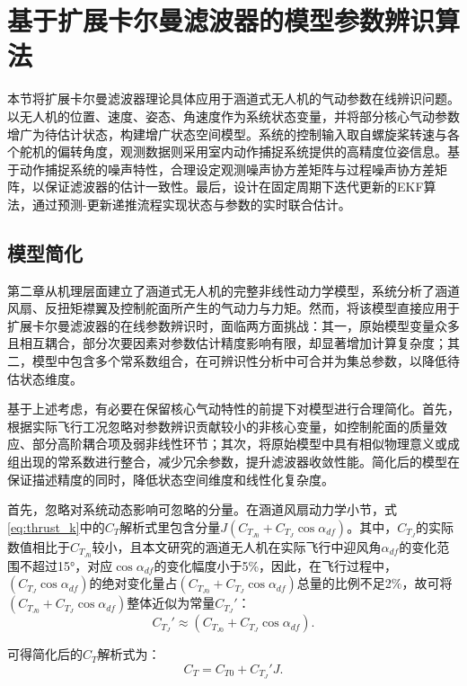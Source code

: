 \section{基于扩展卡尔曼滤波器的模型参数辨识算法} %
本节将扩展卡尔曼滤波器理论具体应用于涵道式无人机的气动参数在线辨识问题。以无人机的位置、速度、姿态、角速度作为系统状态变量，并将部分核心气动参数增广为待估计状态，构建增广状态空间模型。系统的控制输入取自螺旋桨转速与各个舵机的偏转角度，观测数据则采用室内动作捕捉系统提供的高精度位姿信息。基于动作捕捉系统的噪声特性，合理设定观测噪声协方差矩阵与过程噪声协方差矩阵，以保证滤波器的估计一致性。最后，设计在固定周期下迭代更新的EKF算法，通过预测-更新递推流程实现状态与参数的实时联合估计。
\subsection{模型简化} %
\label{sec:model_simplification}
第二章从机理层面建立了涵道式无人机的完整非线性动力学模型，系统分析了涵道风扇、反扭矩襟翼及控制舵面所产生的气动力与力矩。然而，将该模型直接应用于扩展卡尔曼滤波器的在线参数辨识时，面临两方面挑战：其一，原始模型变量众多且相互耦合，部分次要因素对参数估计精度影响有限，却显著增加计算复杂度；其二，模型中包含多个常系数组合，在可辨识性分析中可合并为集总参数，以降低待估状态维度。

基于上述考虑，有必要在保留核心气动特性的前提下对模型进行合理简化。首先，根据实际飞行工况忽略对参数辨识贡献较小的非核心变量，如控制舵面的质量效应、部分高阶耦合项及弱非线性环节；其次，将原始模型中具有相似物理意义或成组出现的常系数进行整合，减少冗余参数，提升滤波器收敛性能。简化后的模型在保证描述精度的同时，降低状态空间维度和线性化复杂度。

首先，忽略对系统动态影响可忽略的分量。在涵道风扇动力学小节，式\eqref{eq:thrust_k}中的$C_T$解析式里包含分量$J(C_{T_{J0}} + C_{T_J} \cos\alpha_{df})$。其中，$C_{T_J}$的实际数值相比于$C_{T_{J0}}$较小，且本文研究的涵道无人机在实际飞行中迎风角$\alpha _{df}$的变化范围不超过15°，对应$\cos\alpha_{df}$的变化幅度小于5\%，因此，在飞行过程中，$(C_{T_J} \cos\alpha_{df})$的绝对变化量占$(C_{T_{J0}} + C_{T_J} \cos\alpha_{df})$总量的比例不足2\%，故可将$(C_{T_{J0}} + C_{T_J} \cos\alpha_{df})$整体近似为常量$C_{T_J}'$：
\begin{equation}
    C_{T_J}' \approx (C_{T_{J0}} + C_{T_J} \cos\alpha_{df}).
\end{equation}

可得简化后的$C_T$解析式为：
\begin{equation}
    C_T = C_{T0} + C_{T_J}' J.
    \label{eq:C_T}
\end{equation}

